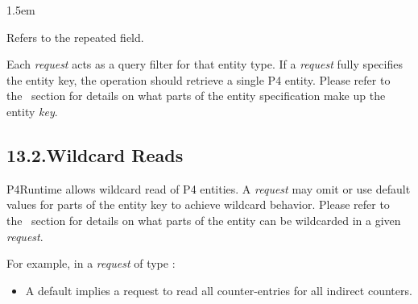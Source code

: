 \documentclass[11pt]{article}
\begin{document}
{\begin{mddefinitions}

\begin{mdbmarginx}{}{}{}{1.5em}%
\begin{mddefdata}%
Refers to the  repeated field.%
\end{mddefdata}%
\end{mdbmarginx}%
\end{mddefinitions}%

\noindent{}Each \emph{request} acts as a query filter for that entity type. If a \emph{request} fully
specifies the entity key, the  operation should retrieve a single P4
entity.  Please refer to the~ section
for details on what parts of the entity specification make up the entity \emph{key}.%

\subsection{13.2.\hspace*{0.5em}Wildcard Reads}\label{sec-wildcard-reads}%

\noindent{}P4Runtime allows wildcard read of P4 entities. A \emph{request} may omit or use
default values for parts of the entity key to achieve wildcard behavior. Please
refer to the~ section for details on
what parts of the entity can be wildcarded in a given \emph{request}.%

For example, in a \emph{request} of type :%

\begin{itemize}[noitemsep,topsep=\mdcompacttopsep]%

\item{}A default  implies a request to read all counter-entries for all
indirect counters.%


\end{itemize}}
\end{document}
